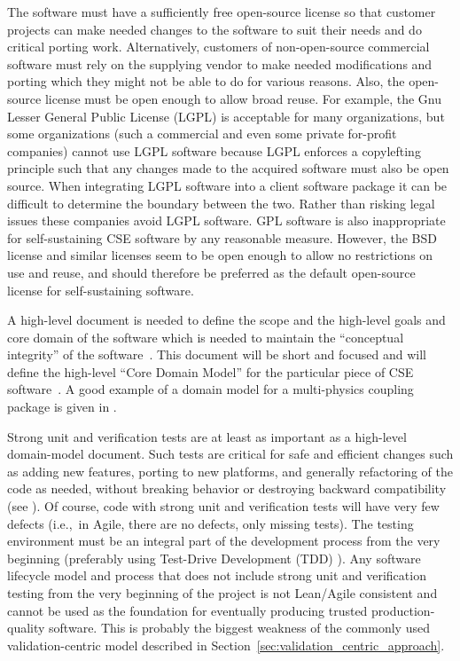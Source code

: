 \documentclass[11pt]{SANDreport}
\begin{document}
The software must have a sufficiently free open-source license so that
customer projects can make needed changes to the software to suit
their needs and do critical porting work.  Alternatively, customers of
non-open-source commercial software must rely on the supplying vendor
to make needed modifications and porting which they might not be able
to do for various reasons.  Also, the open-source license must be open
enough to allow broad reuse.  For example, the Gnu Lesser General Public License (LGPL) is acceptable for many
organizations, but some organizations (such a commercial and even some
private for-profit companies) cannot use LGPL software because LGPL enforces a copylefting principle such that any changes made to the acquired software must also be open source.  When integrating LGPL software into a client software package it can be difficult to determine the boundary between the two.  Rather than risking legal issues these companies avoid LGPL software.  GPL software
is also inappropriate for self-sustaining CSE software by any
reasonable measure.  However, the BSD license and similar licenses seem to be open enough
to allow no restrictions on use and reuse, and should therefore be
preferred as the default open-source license for self-sustaining
software.

A high-level document is needed to define the scope and the high-level
goals and core domain of the software which is needed to maintain the
``conceptual integrity'' of the software~\cite{MythicalManMonth95}.
This document will be short and focused and will define the high-level
``Core Domain Model'' for the particular piece of CSE
software~\cite{DomainDrivenDesign}.  A good example of a domain model
for a multi-physics coupling package is given in {}\cite{LIMEtheory}.

Strong unit and verification tests are at least as important as a 
high-level domain-model document.  Such tests are critical for safe and efficient changes such as
adding new features, porting to new platforms, and generally refactoring of the
code as needed, without breaking behavior or destroying backward
compatibility (see {}\cite{WorkingEffectivelyWithLegacyCode05}).  Of
course, code with strong unit and verification tests will have very
few defects (i.e.,\ in Agile, there are no defects, only missing
tests).  The testing environment must be an integral part of the development process from the very beginning (preferably using
Test-Drive Development (TDD) {}\cite{TDD}).  Any software lifecycle
model and process that does not include strong unit and verification
testing from the very beginning of the project is not Lean/Agile
consistent and cannot be used as the foundation for eventually
producing trusted production-quality software.  This is probably the biggest weakness of the commonly used validation-centric model described in Section~\ref{sec:validation_centric_approach}.
\end{document}
